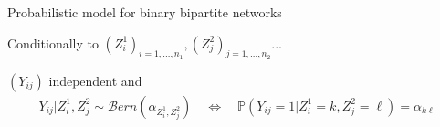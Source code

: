 \documentclass[compress,10pt]{beamer}
\begin{document}
\begin{frame}{Probabilistic model for binary  bipartite networks}


\begin{block}{Conditionally to $(Z^1_i)_{i=1,\dots,n_1},(Z^2_j)_{j=1,\dots,n_2}$... }

$(Y_{ij})$ independent and 
\begin{eqnarray*}
 Y_{ij}  | Z^1_i, Z^2_j \sim  \mathcal{B}ern(\alpha_{Z^1_i,Z^2_j}) \quad \Leftrightarrow \quad   \mathbb{P}(Y_{ij} = 1 | Z^1_i = k, Z^2_j = \ell)  =  \alpha_{k\ell}
\end{eqnarray*}
\end{block}
 

\textcolor{blue}{\cite{Govaert2008}}

\end{frame}

\end{document}
